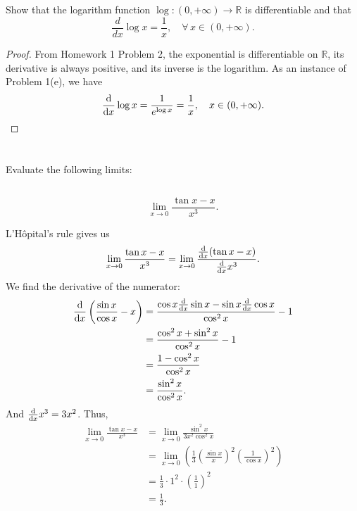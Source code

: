 \documentclass[12pt]{article}
\newenvironment{problem}
    {\begin{lrbox}{\mybox}\begin{minipage}{0.98\textwidth}}
    {\end{minipage}\end{lrbox}\begin{center}\framebox[\textwidth]{\usebox{\mybox}}\end{center}}
\theoremstyle{definition}
\newcommand{\R}{\mathbb{R}}
\begin{document}
\subsection{}
\begin{problem}
    Show that the logarithm function $\log:(0,+\infty)\to \R$ is  differentiable and that 
    \begin{equation}
    \frac{d}{dx} \log x = \frac{1}{x},\quad \forall\,x \in (0,+\infty).
    \end{equation}
\end{problem}

\begin{proof}
    From Homework 1 Problem 2, the exponential is differentiable on $\R$, its derivative is always positive, and its inverse is the logarithm. As an instance of Problem 1(e), we have
    \[
        \dv{x}\log x = \frac{1}{e^{\log x}} = \frac{1}{x}, \quad x \in (0, +\infty).
    \]
    
\end{proof}

\newpage
\section{}
\begin{problem}
    Evaluate the following limits:
\end{problem}

\subsection{}
\begin{problem}
    \begin{equation}
    \lim_{x\to 0} \frac{\tan x - x}{x^3}.
    \end{equation}
\end{problem}

L'H\^opital's rule gives us
\[
    \lim_{x\to 0} \frac{\tan x - x}{x^3} = \lim_{x\to 0} \frac{\dv{x}(\tan x - x)}{\dv{x}x^3}.
\]
We find the derivative of the numerator:
\begin{align*}
    \dv{x}\left(\frac{\sin x}{\cos x} - x\right)
        &= \frac{\cos x \dv{x}\sin x - \sin x \dv{x}\cos x}{\cos^2 x} - 1 \\
        &= \frac{\cos^2 x + \sin^2 x}{\cos^2 x} - 1 \\
        &= \frac{1 - \cos^2 x}{\cos^2 x} \\
        &= \frac{\sin^2 x}{\cos^2 x}.
\end{align*}
And $\dv{x}x^3 = 3x^2$. Thus,
\begin{align*}
     \lim_{x\to 0} \frac{\tan x - x}{x^3}
        &= \lim_{x\to 0}\frac{\sin^2 x}{3x^2\cos^2 x} \\
        &= \lim_{x\to 0} \left( \frac13 \left(\frac{\sin x}{x}\right)^2\left(\frac{1}{\cos x}\right)^2 \right) \\
        &= \frac13 \cdot 1^2 \cdot \left(\frac11\right)^2 \\
        &= \frac13.
\end{align*}
\end{document}
